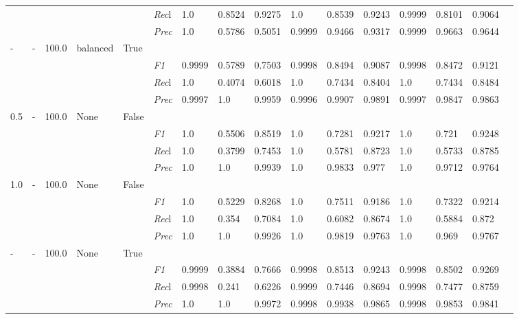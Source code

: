 \begin{table}[]
\begin{tabularx}{\textwidth}{XXXXX|X|XXX|XXX|XXXX}
    & & & & & \textit{Rec}l & 1.0 & 0.8524 & 0.9275    & 1.0 & 0.8539    & 0.9243    & 0.9999    & 0.8101    & 0.9064    \\
    & & & & & \textit{Prec} & 1.0 & 0.5786 & 0.5051 & 0.9999 & 0.9466 & 0.9317 & 0.9999 & 0.9663 & 0.9644 \\ \midrule
    - & - & 100.0 & balanced & True& & & & & & & & & \\
    & & & & & \textit{F1} & 0.9999 & 0.5789 & 0.7503 & 0.9998 & 0.8494        & 0.9087        & 0.9998        & 0.8472        & 0.9121        \\
    & & & & & \textit{Rec}l & 1.0 & 0.4074 & 0.6018    & 1.0 & 0.7434    & 0.8404    & 1.0    & 0.7434    & 0.8484    \\
    & & & & & \textit{Prec} & 0.9997 & 1.0 & 0.9959 & 0.9996 & 0.9907 & 0.9891 & 0.9997 & 0.9847 & 0.9863 \\ \midrule
    0.5 & - & 100.0 & None & False& & & & & & & & & \\
    & & & & & \textit{F1} & 1.0 & 0.5506 & 0.8519 & 1.0 & 0.7281        & 0.9217        & 1.0        & 0.721        & 0.9248        \\
    & & & & & \textit{Rec}l & 1.0 & 0.3799 & 0.7453    & 1.0 & 0.5781    & 0.8723    & 1.0    & 0.5733    & 0.8785    \\
    & & & & & \textit{Prec} & 1.0 & 1.0 & 0.9939 & 1.0 & 0.9833 & 0.977 & 1.0 & 0.9712 & 0.9764 \\ \midrule
    1.0 & - & 100.0 & None & False& & & & & & & & & \\
    & & & & & \textit{F1} & 1.0 & 0.5229 & 0.8268 & 1.0 & 0.7511        & 0.9186        & 1.0        & 0.7322        & 0.9214        \\
    & & & & & \textit{Rec}l & 1.0 & 0.354 & 0.7084    & 1.0 & 0.6082    & 0.8674    & 1.0    & 0.5884    & 0.872    \\
    & & & & & \textit{Prec} & 1.0 & 1.0 & 0.9926 & 1.0 & 0.9819 & 0.9763 & 1.0 & 0.969 & 0.9767 \\ \midrule
    - & - & 100.0 & None & True& & & & & & & & & \\
    & & & & & \textit{F1} & 0.9999 & 0.3884 & 0.7666 & 0.9998 & 0.8513        & 0.9243        & 0.9998        & 0.8502        & 0.9269        \\
    & & & & & \textit{Rec}l & 0.9998 & 0.241 & 0.6226    & 0.9999 & 0.7446    & 0.8694    & 0.9998    & 0.7477    & 0.8759    \\
    & & & & & \textit{Prec} & 1.0 & 1.0 & 0.9972 & 0.9998 & 0.9938 & 0.9865 & 0.9998 & 0.9853 & 0.9841 \\ \midrule

\end{tabularx}
\end{table}

